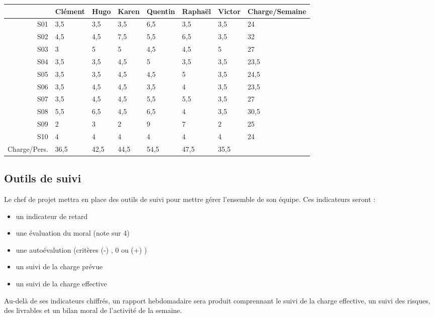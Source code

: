 \begin{tabular}{|r|l|l|l|l|l|l|l|}
\hline
&Clément&Hugo&Karen&Quentin&Raphaël&Victor&Charge/Semaine\\
\hline
S01&3,5&3,5&3,5&6,5&3,5&3,5&24\\
\hline
S02&4,5&4,5&7,5&5,5&6,5&3,5&32\\
\hline
S03&3&5&5&4,5&4,5&5&27\\
\hline
S04&3,5&3,5&4,5&5&3,5&3,5&23,5\\
\hline
S05&3,5&3,5&4,5&4,5&5&3,5&24,5\\
\hline
S06&3,5&4,5&4,5&3,5&4&3,5&23,5\\
\hline
S07&3,5&4,5&4,5&5,5&5,5&3,5&27\\
\hline
S08&5,5&6,5&4,5&6,5&4&3,5&30,5\\
\hline
S09&2&3&2&9&7&2&25\\
\hline
S10&4&4&4&4&4&4&24\\
\hline
Charge/Pers.&36,5&42,5&44,5&54,5&47,5&35,5&\\
\hline
\end{tabular}


\subsection{Outils de suivi}

Le chef de projet mettra en place des outils de suivi pour mettre gérer l'ensemble de son équipe. 
Ces indicateurs seront : 
\begin{itemize}
\item un indicateur de retard
\item une évaluation du moral (note sur 4)
\item une autoévalution (critères (-) , 0 ou (+) )
\item un suivi de la charge prévue
\item un suivi de la charge effective
\end{itemize}

Au-delà de ses indicateurs chiffrés, un rapport hebdomadaire sera produit comprennant le suivi de la charge effective, un suivi des risques, des livrables et un bilan moral de l'activité de la semaine.
